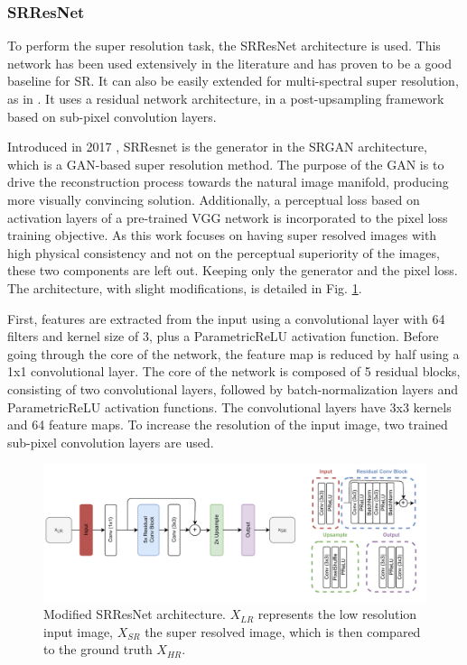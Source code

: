 \subsubsection{SRResNet}

    
    To perform the super resolution task, the SRResNet architecture is used. This network has been used extensively in the literature and has proven to be a good baseline for SR. It can also be easily extended for multi-spectral super resolution, as in \cite{myself2023}. It uses a residual network architecture, in a post-upsampling framework based on sub-pixel convolution layers.
    
    Introduced in 2017 \cite{ledig2017photorealistic}, SRResnet is the generator in the SRGAN architecture, which is a GAN-based super resolution method. The purpose of the GAN is to drive the reconstruction process towards the natural image manifold, producing more visually convincing solution. Additionally, a perceptual loss based on activation layers of a pre-trained VGG network \cite{simonyan2015deep} is incorporated to the pixel loss training objective. As this work focuses on having super resolved images with high physical consistency and not on the perceptual superiority of the images, these two components are left out.  Keeping only the generator and the pixel loss. The architecture, with slight modifications, is detailed in Fig. \ref{fig:3-resnet-architecture}.

    First, features are extracted from the input using a convolutional layer with 64 filters and kernel size of 3, plus a ParametricReLU activation function.
    Before going through the core of the network, the feature map is reduced by half using a 1x1 convolutional layer.
    The core of the network is composed of 5 residual blocks, consisting of two convolutional layers, followed by batch-normalization layers and ParametricReLU activation functions. 
    The convolutional layers have 3x3 kernels and 64 feature maps. 
    To increase the resolution of the input image, two trained sub-pixel convolution layers are used.

    \begin{figure}[H]
        \centering
        \includegraphics[width=1\textwidth]{Includes/3-srresnet-architecture.pdf}
        \caption{ Modified SRResNet architecture. $X_{LR}$ represents the low resolution input image, $X_{SR}$ the super resolved image, which is then compared to the ground truth $X_{HR}$.}
        \label{fig:3-resnet-architecture}
     \end{figure}
    
